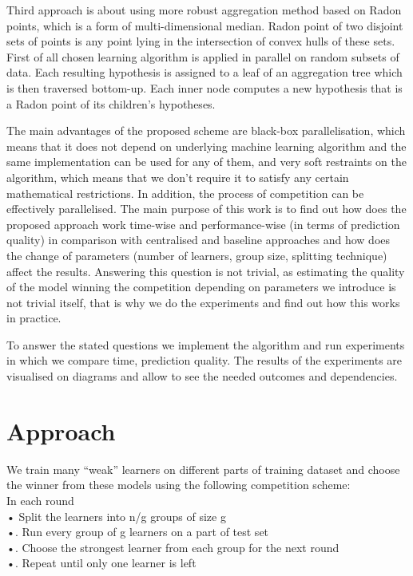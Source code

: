 \documentclass{scrartcl}
\begin{document}
Third approach is about using more robust aggregation method based on Radon points, which is a form of multi-dimensional median. Radon point of two disjoint sets of points is any point lying in the intersection of convex hulls of these sets. First of all chosen learning algorithm is applied in parallel on random subsets of data. Each resulting hypothesis is assigned to a leaf of an aggregation tree which is then traversed bottom-up. Each inner node computes a new hypothesis that is a Radon point of its children’s hypotheses.

The main advantages of the proposed scheme are black-box parallelisation, which means that it does not depend on underlying machine learning algorithm and the same implementation can be used for any of them, and very soft restraints on the algorithm, which means that we don't require it to satisfy any certain mathematical restrictions. In addition, the process of competition can be effectively parallelised.
The main purpose of this work is to find out how does the proposed approach work time-wise and performance-wise (in terms of prediction quality) in comparison with centralised and baseline approaches and how does the change of parameters (number of learners, group size, splitting technique) affect the results. 
Answering this question is not trivial, as estimating the quality of the model winning the competition depending on parameters we introduce is not trivial itself, that is why we do the experiments and find out how this works in practice. 

To answer the stated questions we implement the algorithm and run experiments in which we compare time, prediction quality. The results of the experiments are visualised on diagrams and allow to see the needed outcomes and dependencies.


\section{Approach}
We train many “weak” learners on different parts of training dataset and choose the winner from these models using the following competition scheme:\\
In each round\\
•   Split the learners into n/g groups of size g\\
•.  Run every group of g learners on a part of test set\\
•.  Choose the strongest learner from each group for the next round\\
•.  Repeat until only one learner is left\\
\end{document}
